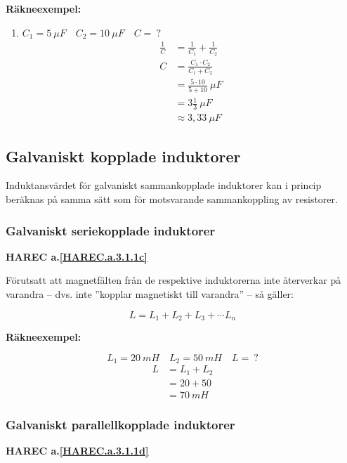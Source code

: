 \textbf{Räkneexempel:}

\begin{enumerate}
  \item \(C_1 = 5\ \mu F \quad C_2 = 10\ \mu F \quad C =\ ?\)
    \begin{align*}
      \frac{1}{C} &= \frac{1}{C_1} + \frac{1}{C_2} \\
      C &= \frac{C_1 \cdot C_2}{C_1 + C_2} \\
      &= \frac{5 \cdot 10}{5 + 10}\ \mu F \\
      &= 3\frac{1}{3}\ \mu F \\
      &\approx 3,33\ \mu F
    \end{align*}
\end{enumerate}

\subsection{Galvaniskt kopplade induktorer}

Induktansvärdet för galvaniskt sammankopplade induktorer kan i princip
beräknas på samma sätt som för motsvarande sammankoppling av resistorer.

\subsubsection{Galvaniskt seriekopplade induktorer}
\textbf{HAREC a.\ref{HAREC.a.3.1.1c}\label{myHAREC.a.3.1.1c}}

Förutsatt att magnetfälten från de respektive induktorerna inte återverkar på
varandra -- dvs. inte ''kopplar magnetiskt till varandra'' -- så gäller:

\[L = L_1 + L_2 + L_3 + \cdots L_n\]

\textbf{Räkneexempel:}

\[L_1 = 20\ mH \quad L_2 = 50\ mH \quad L =\ ?\]
\begin{align*}
  L &= L_1 + L_2 \\
  & = 20 + 50 \\
  &= 70\ mH
\end{align*}

\subsubsection{Galvaniskt parallellkopplade induktorer}
\textbf{HAREC a.\ref{HAREC.a.3.1.1d}\label{myHAREC.a.3.1.1d}}

